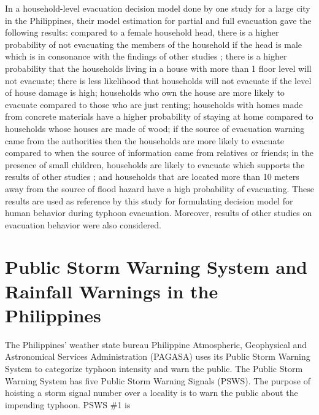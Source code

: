 \documentclass[runningheads]{llncs}
\begin{document}
In a household-level evacuation decision model done by one study \cite{lim2016household} for a large city in the Philippines, their model estimation for partial and full evacuation gave the following results: compared to a female household head, there is a higher probability of not evacuating the members of the household if the head is male which is in consonance with the findings of other studies \cite{horney2010individual, lindell2005household, morrow2005hurricane}; there is a higher probability that the households living in a house with more than 1 floor level will not evacuate; there is less likelihood that households will not evacuate if the level of house damage is high; households who own the house are more likely to evacuate compared to those who are just renting; households with homes made from concrete materials have a higher probability of staying at home compared to households whose houses are made of wood; if the source of evacuation warning came from the authorities then the households are more likely to evacuate compared to when the source of information came from relatives or friends; in the presence of small children, households are likely to evacuate which supports the results of other studies \cite{cahyanto2014empirical, fischer1995evacuation, dash2002decision}; and households that are located more than 10 meters away from the source of flood hazard have a high probability of evacuating. These results are used as reference by this study for formulating decision model for human behavior during typhoon evacuation. Moreover, results of other studies \cite{medina2016should, fu2004sequential, fu2006sequential, cahyanto2014empirical, stopher2004dynamic, fu2004sequential, whitehead2000heading} on evacuation behavior were also considered.


\section{Public Storm Warning System and Rainfall Warnings in the Philippines}
The Philippines' weather state bureau Philippine Atmospheric, Geophysical and Astronomical Services Administration (PAGASA) uses its Public Storm Warning System to categorize typhoon intensity and warn the public. The Public Storm Warning System has five Public Storm Warning Signals (PSWS). The purpose of hoisting a storm signal number over a locality is to warn the public about the impending typhoon. PSWS \#1 is 
\end{document}
